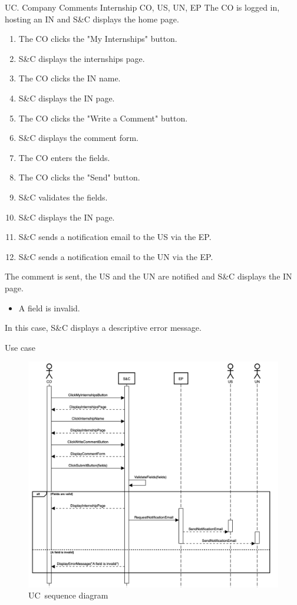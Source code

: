 \begin{usecase}
    {UC\theuc. Company Comments Internship}
    {CO, US, UN, EP}
    {The CO is logged in, hosting an IN and S\&C displays the home page.}
    {\begin{enumerate}[leftmargin=*]
        \item The CO clicks the "My Internships" button.
        \item S\&C displays the internships page.
        \item The CO clicks the IN name.
        \item S\&C displays the IN page.
        \item The CO clicks the "Write a Comment" button.
        \item S\&C displays the comment form.
        \item The CO enters the fields.
        \item The CO clicks the "Send" button.
        \item S\&C validates the fields.
        \item S\&C displays the IN page.
        \item S\&C sends a notification email to the US via the EP.
        \item S\&C sends a notification email to the UN via the EP.
    \end{enumerate}}
    {The comment is sent, the US and the UN are notified and S\&C displays the IN page.}
    {\begin{itemize}[leftmargin=*, label=\tiny\textbullet]
        \item A field is invalid.
    \end{itemize}
    In this case, S\&C displays a descriptive error message.}
    {Use case \theuc}
\end{usecase}

\begin{figure}
    \centering
    \includegraphics[width=16cm]{images/sequence-diagrams/company-comments-internship.png}
    \caption{UC\theuc\ sequence diagram}
\end{figure}

